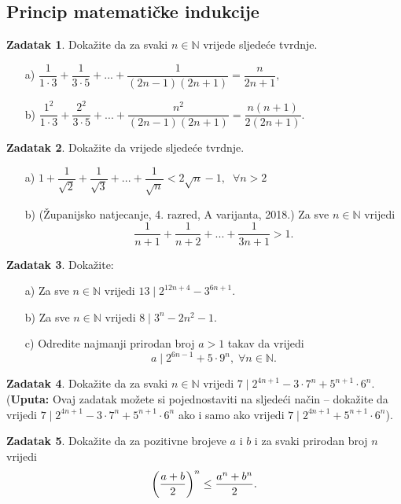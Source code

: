 \documentclass{book}
\let\originalleft\left
\let\originalright\right
\renewcommand{\left}{\mathopen{}\mathclose\bgroup\originalleft}
\renewcommand{\right}{\aftergroup\egroup\originalright}
\theoremstyle{definition}
\theoremstyle{definition}
\newtheorem{exercise}{Zadatak}
\theoremstyle{remark}
\begin{document}
\subsection*{Princip matematičke indukcije}
\begin{exercise}
Dokažite da za svaki $n\in \mathbb{N}$ vrijede sljedeće tvrdnje.
\begin{itemize}
\item[a)] $\dfrac{1}{1\cdot 3}+\dfrac{1}{3\cdot 5}+...+\dfrac{1}{(2n-1)(2n+1)}=\dfrac{n}{2n+1},$
\item[b)] $\dfrac{1^2}{1\cdot 3}+\dfrac{2^2}{3\cdot 5}+... +\dfrac{n^2}{(2n-1)(2n+1)}=\dfrac{n(n+1)}{2(2n+1)}.$
\end{itemize}
\end{exercise}
\begin{exercise}
\label{nejedn}
Dokažite da vrijede sljedeće tvrdnje.
\begin{itemize}
\item[a)] $1+\dfrac{1}{\sqrt{2}}+\dfrac{1}{\sqrt{3}}+...+\dfrac{1}{\sqrt{n}}<2\sqrt{n}-1, \; \; \forall n>2$
\item[b)] (Županijsko natjecanje, 4. razred, A varijanta, 2018.) Za sve $n\in \mathbb{N}$ vrijedi $$\dfrac{1}{n+1}+\dfrac{1}{n+2}+...+\dfrac{1}{3n+1}>1.$$
\end{itemize}
\end{exercise}
\begin{exercise}
Dokažite:
\begin{itemize}
\item[a)] Za sve $n\in \mathbb{N}$ vrijedi $13 \; |\; 2^{12n+4}-3^{6n+1}$.
\item[b)] Za sve $n\in \mathbb{N}$ vrijedi $8\; |\; 3^n-2n^2-1$.
\item[c)] Odredite najmanji prirodan broj $a>1$ takav da vrijedi
$$a \mid 2^{6n-1}+5\cdot 9^n,\; \forall n\in \mathbb{N}.$$
\end{itemize}
\end{exercise}
\begin{exercise}
Dokažite da za svaki $n\in \mathbb{N}$ vrijedi $7 \; |\; 2^{4n+1}-3\cdot 7^n+5^{n+1}\cdot 6^n$. (\textbf{Uputa:} Ovaj zadatak možete si pojednostaviti na sljedeći način -- dokažite da vrijedi $7 \; |\; 2^{4n+1}-3\cdot 7^n+5^{n+1}\cdot 6^n$ ako i samo ako vrijedi $7 \; |\; 2^{4n+1}+5^{n+1}\cdot 6^n$).
\end{exercise}
\begin{exercise}
Dokažite da za pozitivne brojeve $a$ i $b$ i za svaki prirodan broj $n$ vrijedi
$$\left(\dfrac{a+b}{2}\right)^n\leq \dfrac{a^n+b^n}{2}.$$
\end{exercise}
\end{document}
